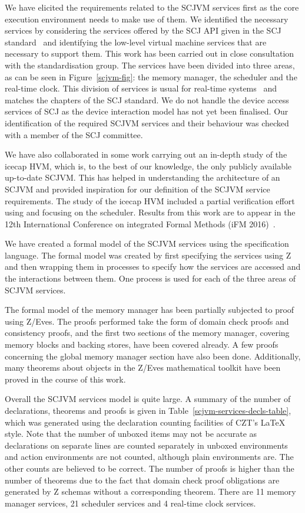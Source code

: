 \documentclass[a4paper,10pt]{report}
\begin{document}
We have elicited the requirements related to the SCJVM services first
as the core execution environment needs to make use of them.
We identified the necessary services by considering the services
offered by the SCJ API given in the SCJ standard~\cite{locke2013} and
identifying the low-level virtual machine services that are necessary
to support them.
This work has been carried out in close consultation with the
standardisation group.
The services have been divided into three areas, as can be seen in
Figure~\ref{scjvm-fig}: the memory manager, the scheduler and the
real-time clock.
This division of services is usual for real-time systems~\cite{li2003}
and matches the chapters of the SCJ standard.
We do not handle the device access services of SCJ as the device
interaction model has not yet been finalised.
Our identification of the required SCJVM services and their behaviour
was checked with a member of the SCJ committee.

We have also collaborated in some work carrying out an in-depth study
of the icecap HVM, which is, to the best of our knowledge, the only
publicly available up-to-date SCJVM.
This has helped in understanding the architecture of an SCJVM and
provided inspiration for our definition of the SCJVM service
requirements.
The study of the icecap HVM included a partial verification effort
using \Circus{} and focusing on the scheduler.
Results from this work are to appear in the 12th International
Conference on integrated Formal Methods (iFM
2016)~\cite{freitas2016inpress}.

We have created a formal model of the SCJVM services using the
\Circus{} specification language.
The formal model was created by first specifying the services using Z
and then wrapping them in \Circus{} processes to specify how the
services are accessed and the interactions between them.
One \Circus{} process is used for each of the three areas of SCJVM
services.

The formal model of the memory manager has been partially subjected to
proof using Z/Eves.
The proofs performed take the form of domain check proofs and
consistency proofs, and the first two sections of the memory manager,
covering memory blocks and backing stores, have been covered already.
A few proofs concerning the global memory manager section have also
been done.
Additionally, many theorems about objects in the Z/Eves mathematical
toolkit have been proved in the course of this work.

Overall the SCJVM services model is quite large.
A summary of the number of declarations, theorems and proofs is given
in Table~\ref{scjvm-services-decls-table}, which was generated using
the declaration counting facilities of CZT's \LaTeX{} style.
Note that the number of unboxed items may not be accurate as
declarations on separate lines are counted separately in unboxed
environments and \Circus{} action environments are not counted,
although plain \Circus{} environments are.
The other counts are believed to be correct.
The number of proofs is higher than the number of theorems due to the
fact that domain check proof obligations are generated by Z schemas
without a corresponding theorem.
There are 11 memory manager services, 21 scheduler services and 4
real-time clock services.
\end{document}

